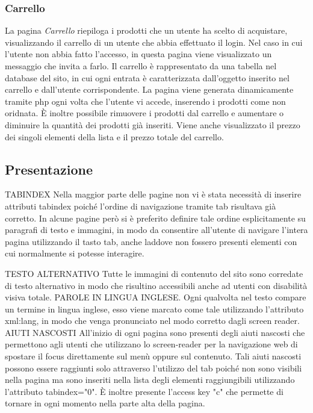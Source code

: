 		\subsubsection{Carrello}
			La pagina \emph{Carrello} riepiloga i prodotti che un utente ha scelto di acquistare, visualizzando il carrello di un utente che abbia effettuato il login.
			Nel caso in cui l'utente non abbia fatto l'accesso, in questa pagina viene visualizzato un messaggio che invita a farlo.
			Il carrello è rappresentato da una tabella nel database del sito, in cui ogni entrata è caratterizzata dall'oggetto inserito nel carrello e dall'utente corrispondente. La pagina viene generata dinamicamente tramite php ogni volta che l'utente vi accede, inserendo i prodotti come non oridnata. È inoltre possibile rimuovere i prodotti dal carrello e aumentare o diminuire la quantità dei prodotti già inseriti.
			Viene anche visualizzato il prezzo dei singoli elementi della lista e il prezzo totale del carrello.
    \subsection{Presentazione}
		TABINDEX
		Nella maggior parte delle pagine non vi è stata necessità di inserire attributi tabindex poiché l'ordine di navigazione tramite tab risultava già corretto.
		In alcune pagine però si è preferito definire tale ordine esplicitamente su paragrafi di testo e immagini, in modo da consentire all'utente di navigare l'intera pagina utilizzando il tasto tab, anche laddove non fossero presenti elementi con cui normalmente si potesse interagire.

		TESTO ALTERNATIVO
		Tutte le immagini di contenuto del sito sono corredate di testo alternativo in modo che risultino accessibili anche ad utenti con disabilità visiva totale.
		PAROLE IN LINGUA INGLESE.
		Ogni qualvolta nel testo compare un termine in lingua inglese, esso viene marcato come tale utilizzando l'attributo xml:lang, in modo che venga pronunciato nel modo corretto dagli screen reader.
		AIUTI NASCOSTI
		All'inizio di ogni pagina sono presenti degli aiuti nascosti che permettono agli utenti che utilizzano lo screen-reader per la navigazione web di spostare il focus direttamente sul menù oppure sul contenuto.
		Tali aiuti nascosti possono essere raggiunti solo attraverso l'utilizzo del tab poiché non sono visibili nella pagina ma sono inseriti nella lista degli elementi raggiungibili utilizzando l'attributo tabindex="0".
		È inoltre presente l'access key "c" che permette di tornare in ogni momento nella parte alta della pagina.

